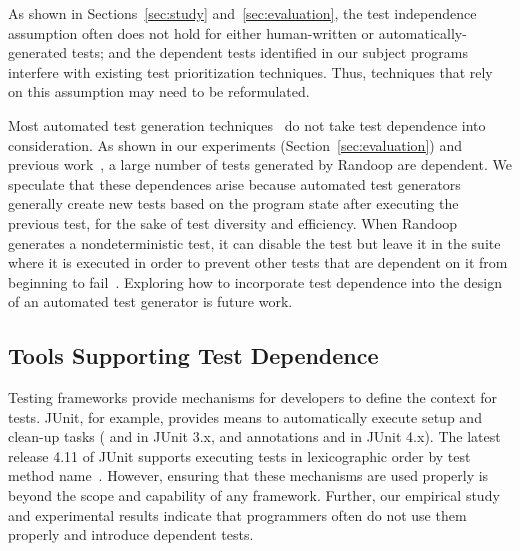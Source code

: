 As shown in Sections~\ref{sec:study} and~\ref{sec:evaluation},
the test independence assumption often does not hold for either
human-written or automatically-generated tests; and the dependent
tests identified in our subject programs interfere with
existing test prioritization techniques. Thus, techniques
that rely on this assumption may need to be reformulated.

Most automated test generation
techniques~\cite{PachecoLET2007, Wang:2007:AGC,
ZhangSBE2011} do not take test dependence
into consideration. As shown in our experiments
(Section~\ref{sec:evaluation}) and previous work~\cite{RobinsonEPAL2011},
a large number of tests generated by Randoop are dependent.
We speculate that these dependences arise because automated
test generators generally create new tests
based on the program state after executing the previous test,
for the sake of test diversity and efficiency. 
When Randoop generates a nondeterministic test, it can disable the test but
leave it in the suite where it is executed in order to prevent other tests
that are dependent on it from beginning to fail~\cite{RobinsonEPAL2011}.
Exploring how to incorporate test dependence into the design of an automated
test generator is future work.



\subsection{Tools Supporting Test Dependence}
\label{sec:supporting}

Testing frameworks provide mechanisms
for developers to define the context for tests.
JUnit, for example, provides means to
automatically execute setup and clean-up tasks
( and  in JUnit
3.x, and annotations  and  in
JUnit 4.x). The latest release 4.11 of JUnit supports
executing tests in lexicographic order by test method name~\cite{junitordering}.
However, ensuring that these mechanisms are used properly is
beyond the scope and capability of any framework. 
Further, our empirical study and
experimental results indicate that programmers often do not
use them properly and introduce dependent tests. 


